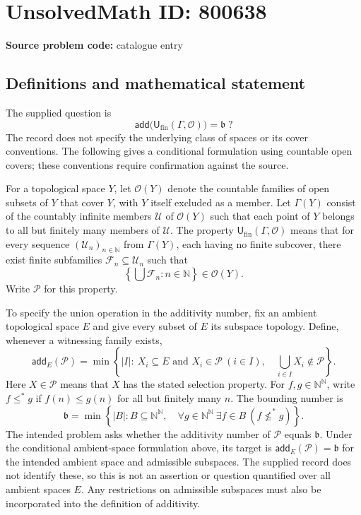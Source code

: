 \documentclass[11pt]{article}
\newcommand{\N}{\mathbb{N}}
\begin{document}
\section*{UnsolvedMath ID: 800638}
\textbf{Source problem code:} catalogue entry
\subsection{Definitions and mathematical statement}
The supplied question is
\[
\mathsf{add}\bigl(\mathsf{U}_{\mathrm{fin}}(\Gamma,\mathcal O)\bigr)=\mathfrak b\;?
\]
The record does not specify the underlying class of spaces or its cover conventions. The following gives a conditional formulation using countable open covers; these conventions require confirmation against the source.

For a topological space \(Y\), let \(\mathcal O(Y)\) denote the countable families of open subsets of \(Y\) that cover \(Y\), with \(Y\) itself excluded as a member. Let \(\Gamma(Y)\) consist of the countably infinite members \(\mathcal U\) of \(\mathcal O(Y)\) such that each point of \(Y\) belongs to all but finitely many members of \(\mathcal U\). The property \(\mathsf{U}_{\mathrm{fin}}(\Gamma,\mathcal O)\) means that for every sequence \((\mathcal U_n)_{n\in\N}\) from \(\Gamma(Y)\), each having no finite subcover, there exist finite subfamilies \(\mathcal F_n\subseteq\mathcal U_n\) such that
\[
\left\{\bigcup\mathcal F_n:n\in\N\right\}\in\mathcal O(Y).
\]
Write \(\mathcal P\) for this property.

To specify the union operation in the additivity number, fix an ambient topological space \(E\) and give every subset of \(E\) its subspace topology. Define, whenever a witnessing family exists,
\[
\mathsf{add}_E(\mathcal P)
=\min\left\{|I|:\ X_i\subseteq E\text{ and }X_i\in\mathcal P\ (i\in I),\quad \bigcup_{i\in I}X_i\notin\mathcal P\right\}.
\]
Here \(X\in\mathcal P\) means that \(X\) has the stated selection property. For \(f,g\in\N^{\N}\), write \(f\leq^*g\) if \(f(n)\leq g(n)\) for all but finitely many \(n\). The bounding number is
\[
\mathfrak b=\min\left\{|B|:B\subseteq\N^{\N},\quad \forall g\in\N^{\N}\ \exists f\in B\ (f\not\leq^*g)\right\}.
\]
The intended problem asks whether the additivity number of \(\mathcal P\) equals \(\mathfrak b\). Under the conditional ambient-space formulation above, its target is \(\mathsf{add}_E(\mathcal P)=\mathfrak b\) for the intended ambient space and admissible subspaces. The supplied record does not identify these, so this is not an assertion or question quantified over all ambient spaces \(E\). Any restrictions on admissible subspaces must also be incorporated into the definition of additivity.
\end{document}
